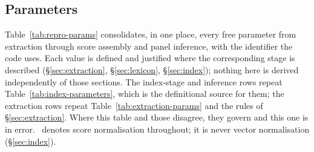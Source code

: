 \subsection{Parameters}
\label{sec:repro-params}

Table~\ref{tab:repro-params} consolidates, in one place, every free
parameter from extraction through score assembly and panel inference, with
the identifier the code uses. Each value is defined and justified where the
corresponding stage is described (\S\ref{sec:extraction}, \S\ref{sec:lexicon},
\S\ref{sec:index}); nothing here is derived independently of those sections.
The index-stage and inference rows repeat Table~\ref{tab:index-parameters},
which is the definitional source for them; the extraction rows repeat
Table~\ref{tab:extraction-params} and the rules of \S\ref{sec:extraction}.
Where this table and those disagree, they govern and this one is in error.
\Z\ denotes score normalisation throughout; it is never vector normalisation
(\S\ref{sec:index}).

